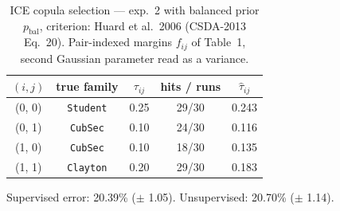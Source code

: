 \begin{table}[htbp]
  \centering
  \caption{ICE copula selection — exp.\ 2 with balanced prior $p_{\text{bal}}$, criterion: Huard et al.\ 2006 (CSDA-2013 Eq.\ 20). Pair-indexed margins $f_{ij}$ of Table~1, second Gaussian parameter read as a variance.}
  \label{tab:exp3-exp2_bal_p__huard}
  \begin{tabular}{ccccc}
    \toprule
    $(i, j)$ & true family & $\tau_{ij}$ & hits / runs & $\hat\tau_{ij}$ \\
    \midrule
    (0, 0) & \texttt{Student} & 0.25 & 29/30 & 0.243 \\
    (0, 1) & \texttt{CubSec} & 0.10 & 24/30 & 0.116 \\
    (1, 0) & \texttt{CubSec} & 0.10 & 18/30 & 0.135 \\
    (1, 1) & \texttt{Clayton} & 0.20 & 29/30 & 0.183 \\
    \bottomrule
  \end{tabular}
  \par\smallskip Supervised error: 20.39\% ($\pm$ 1.05). Unsupervised: 20.70\% ($\pm$ 1.14).
\end{table}
